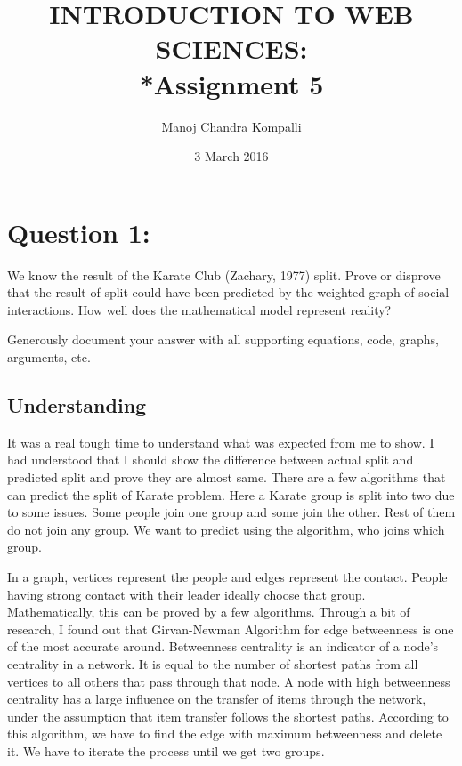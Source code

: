 \documentclass[12pt]{article}
\begin{document}
\begin{titlepage}
\title{INTRODUCTION TO WEB SCIENCES:\\*Assignment 5}
\author{Manoj Chandra Kompalli}
\date{3 March 2016}
\maketitle
\end{titlepage}

\tableofcontents
\newpage

\section{Question 1:  }
  We know the result of the Karate Club (Zachary, 1977) split.
Prove or disprove that the result of split could have been predicted
by the weighted graph of social interactions.  How well does the
mathematical model represent reality?

Generously document your answer with all supporting equations, code,
graphs, arguments, etc.

\subsection{Understanding}
It was a real tough time to understand what was expected from me to show. I had understood that I should show the difference between actual split and predicted split and prove they are almost same. There are a few algorithms that can predict the split of Karate problem. Here a Karate group is split into two due to some issues. Some people join one group and some join the other. Rest of them do not join any group. We want to predict using the algorithm, who joins which group.\par In a graph, vertices represent the people and edges represent the contact. People having strong contact with their leader ideally choose that group. Mathematically, this can be proved by a few algorithms. Through a bit of research, I found out that Girvan-Newman Algorithm for edge betweenness is one of the most accurate around. Betweenness centrality is an indicator of a node's centrality in a network. It is equal to the number of shortest paths from all vertices to all others that pass through that node. A node with high betweenness centrality has a large influence on the transfer of items through the network, under the assumption that item transfer follows the shortest paths. According to this algorithm, we have to find the edge with maximum betweenness and delete it. We have to iterate the process until we get two groups. 
\end{document}
